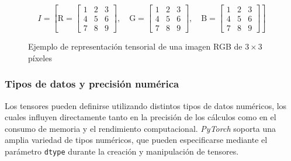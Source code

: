 \begin{figure}[h]
    \centering
    \begin{minipage}{0.95\textwidth}
        \[
            I = \left[
                \text{R} =
                \begin{bmatrix}
                    1 & 2 & 3 \\
                    4 & 5 & 6 \\
                    7 & 8 & 9
                \end{bmatrix},
                \quad
                \text{G} =
                \begin{bmatrix}
                    1 & 2 & 3 \\
                    4 & 5 & 6 \\
                    7 & 8 & 9
                \end{bmatrix},
                \quad
                \text{B} =
                \begin{bmatrix}
                    1 & 2 & 3 \\
                    4 & 5 & 6 \\
                    7 & 8 & 9
                \end{bmatrix}
            \right]
        \]
    \end{minipage}
    \caption{Ejemplo de representación tensorial de una imagen RGB de $3 \times 3$ píxeles}
    \label{fig:30_image_tensor_example}
\end{figure}


\subsubsection{Tipos de datos y precisión numérica} \label{subsubsec:3_6_4_tipos_datos_precision_numerica}
Los tensores pueden definirse utilizando distintos tipos de datos numéricos, los cuales influyen 
directamente tanto en la precisión de los cálculos como en el consumo de memoria y el rendimiento 
computacional. \textit{PyTorch} soporta una amplia variedad de tipos numéricos, que pueden 
especificarse mediante el parámetro \texttt{dtype} \cite{torch_dtype} durante la creación y manipulación de tensores.

